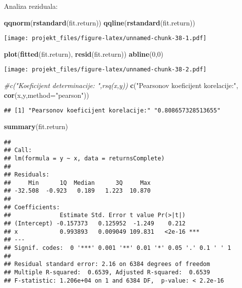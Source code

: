 \documentclass[
]{article}
\newenvironment{Shaded}{\begin{snugshade}}{\end{snugshade}}
\newcommand{\CommentTok}[1]{\textcolor[rgb]{0.56,0.35,0.01}{\textit{#1}}}
\newcommand{\DataTypeTok}[1]{\textcolor[rgb]{0.13,0.29,0.53}{#1}}
\newcommand{\DecValTok}[1]{\textcolor[rgb]{0.00,0.00,0.81}{#1}}
\newcommand{\KeywordTok}[1]{\textcolor[rgb]{0.13,0.29,0.53}{\textbf{#1}}}
\newcommand{\NormalTok}[1]{#1}
\newcommand{\StringTok}[1]{\textcolor[rgb]{0.31,0.60,0.02}{#1}}
\begin{document}
Analiza reziduala:

\begin{Shaded}
\begin{Highlighting}[]
\KeywordTok{qqnorm}\NormalTok{(}\KeywordTok{rstandard}\NormalTok{(fit.return))}
\KeywordTok{qqline}\NormalTok{(}\KeywordTok{rstandard}\NormalTok{(fit.return))}
\end{Highlighting}
\end{Shaded}

\texttt{[image: projekt\_files/figure-latex/unnamed-chunk-38-1.pdf]}

\begin{Shaded}
\begin{Highlighting}[]
\KeywordTok{plot}\NormalTok{(}\KeywordTok{fitted}\NormalTok{(fit.return), }\KeywordTok{resid}\NormalTok{(fit.return))}
\KeywordTok{abline}\NormalTok{(}\DecValTok{0}\NormalTok{,}\DecValTok{0}\NormalTok{)}
\end{Highlighting}
\end{Shaded}

\texttt{[image: projekt\_files/figure-latex/unnamed-chunk-38-2.pdf]}

\begin{Shaded}
\begin{Highlighting}[]
\CommentTok{#c("Koeficijent determinacije: ",rsq(x,y))}
\KeywordTok{c}\NormalTok{(}\StringTok{"Pearsonov koeficijent korelacije:"}\NormalTok{, }\KeywordTok{cor}\NormalTok{(x,y,}\DataTypeTok{method=}\StringTok{"pearson"}\NormalTok{))}
\end{Highlighting}
\end{Shaded}

\begin{verbatim}
## [1] "Pearsonov koeficijent korelacije:" "0.808657328513655"
\end{verbatim}

\begin{Shaded}
\begin{Highlighting}[]
\KeywordTok{summary}\NormalTok{(fit.return)}
\end{Highlighting}
\end{Shaded}

\begin{verbatim}
## 
## Call:
## lm(formula = y ~ x, data = returnsComplete)
## 
## Residuals:
##     Min      1Q  Median      3Q     Max 
## -32.508  -0.923   0.189   1.223  10.870 
## 
## Coefficients:
##              Estimate Std. Error t value Pr(>|t|)    
## (Intercept) -0.157373   0.125952  -1.249    0.212    
## x            0.993893   0.009049 109.831   <2e-16 ***
## ---
## Signif. codes:  0 '***' 0.001 '**' 0.01 '*' 0.05 '.' 0.1 ' ' 1
## 
## Residual standard error: 2.16 on 6384 degrees of freedom
## Multiple R-squared:  0.6539, Adjusted R-squared:  0.6539 
## F-statistic: 1.206e+04 on 1 and 6384 DF,  p-value: < 2.2e-16
\end{verbatim}
\end{document}
